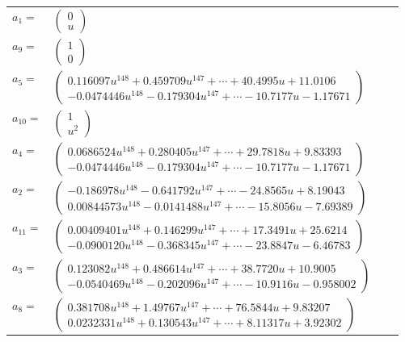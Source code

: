 \documentclass[1p]{elsarticle_modified}
\theoremstyle{definition}
\begin{document}
\begin{tabular}{m{7pt} m{180pt} m{7pt} m{180pt} }
\flushright $a_{1}=$&$\begin{pmatrix}0\\u\end{pmatrix}$ \\
\flushright $a_{9}=$&$\begin{pmatrix}1\\0\end{pmatrix}$ \\
\flushright $a_{5}=$&$\begin{pmatrix}0.116097 u^{148}+0.459709 u^{147}+\cdots+40.4995 u+11.0106\\-0.0474446 u^{148}-0.179304 u^{147}+\cdots-10.7177 u-1.17671\end{pmatrix}$ \\
\flushright $a_{10}=$&$\begin{pmatrix}1\\u^2\end{pmatrix}$ \\
\flushright $a_{4}=$&$\begin{pmatrix}0.0686524 u^{148}+0.280405 u^{147}+\cdots+29.7818 u+9.83393\\-0.0474446 u^{148}-0.179304 u^{147}+\cdots-10.7177 u-1.17671\end{pmatrix}$ \\
\flushright $a_{2}=$&$\begin{pmatrix}-0.186978 u^{148}-0.641792 u^{147}+\cdots-24.8565 u+8.19043\\0.00844573 u^{148}-0.0141488 u^{147}+\cdots-15.8056 u-7.69389\end{pmatrix}$ \\
\flushright $a_{11}=$&$\begin{pmatrix}0.00409401 u^{148}+0.146299 u^{147}+\cdots+17.3491 u+25.6214\\-0.0900120 u^{148}-0.368345 u^{147}+\cdots-23.8847 u-6.46783\end{pmatrix}$ \\
\flushright $a_{3}=$&$\begin{pmatrix}0.123082 u^{148}+0.486614 u^{147}+\cdots+38.7720 u+10.9005\\-0.0540469 u^{148}-0.202096 u^{147}+\cdots-10.9116 u-0.958002\end{pmatrix}$ \\
\flushright $a_{8}=$&$\begin{pmatrix}0.381708 u^{148}+1.49767 u^{147}+\cdots+76.5844 u+9.83207\\0.0232331 u^{148}+0.130543 u^{147}+\cdots+8.11317 u+3.92302\end{pmatrix}$ \\

\end{tabular}
\end{document}
